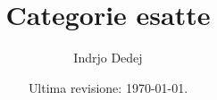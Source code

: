 



\title{Categorie esatte}
\author{Indrjo Dedej}
\date{Ultima revisione: \today{}.}



\maketitle


\tableofcontents




\printbibliography



